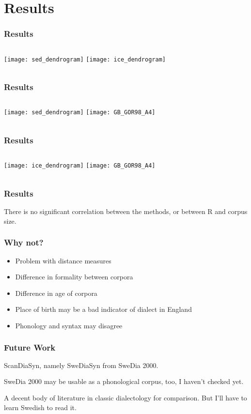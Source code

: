\documentclass{beamer}
\begin{document}
\section{Results}
\begin{frame}
  \frametitle{Results}
  \begin{columns}
  \texttt{[image: sed\_dendrogram]}
  \texttt{[image: ice\_dendrogram]}
\end{columns}
\end{frame}
\begin{frame}
  \frametitle{Results}
  \begin{columns}
  \texttt{[image: sed\_dendrogram]}
  \texttt{[image: GB\_GOR98\_A4]}
\end{columns}
\end{frame}
\begin{frame}
  \frametitle{Results}
  \begin{columns}
  \texttt{[image: ice\_dendrogram]}
  \texttt{[image: GB\_GOR98\_A4]}
\end{columns}
\end{frame}
\begin{frame}
  \frametitle{Results}
  There is no significant correlation between the methods, or between
  R and corpus size.
\end{frame}
\begin{frame}
  \frametitle{Why not?}
  \begin{itemize}
  \item Problem with distance measures
  \item Difference in formality between corpora
  \item Difference in age of corpora
  \item Place of birth may be a bad indicator of dialect in England
  \item Phonology and syntax may disagree
  \end{itemize}
\end{frame}
\begin{frame}
  \frametitle{Future Work}
ScanDiaSyn, namely SweDiaSyn from SweDia 2000.

SweDia 2000 may be usable as a phonological corpus, too, I haven't
checked yet.

A decent body of literature in classic dialectology for
comparison. But I'll have to learn Swedish to read it.
\end{frame}
\end{document}
